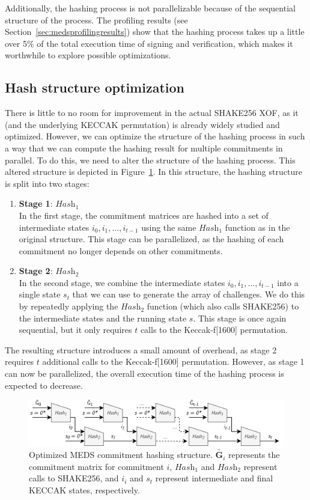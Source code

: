 \documentclass[11pt,a4paper]{report}
\theoremstyle{definition}
\begin{document}
Additionally, the hashing process is not parallelizable because of the sequential structure of the process. The profiling results (see Section~\ref{sec:medsprofilingresults}) show that the hashing process takes up a little over 5\% of the total execution time of signing and verification, which makes it worthwhile to explore possible optimizations.

\subsection{Hash structure optimization}
There is little to no room for improvement in the actual SHAKE256 XOF, as it (and the underlying KECCAK permutation) is already widely studied and optimized. However, we can optimize the structure of the hashing process in such a way that we can compute the hashing result for multiple commitments in parallel. To do this, we need to alter the structure of the hashing process. This altered structure is depicted in Figure~\ref{fig:hashstructureopt}. In this structure, the hashing structure is split into two stages:
\begin{enumerate}
  \item \textbf{Stage 1}: $\textit{Hash}_1$\\
        In the first stage, the commitment matrices are hashed into a set of intermediate states $i_0, i_1, \ldots, i_{t-1}$ using the same $\textit{Hash}_1$ function as in the original structure. This stage can be parallelized, as the hashing of each commitment no longer depends on other commitments.
  \item \textbf{Stage 2}: $\textit{Hash}_2$\\
        In the second stage, we combine the intermediate states $i_0, i_1, \ldots, i_{t-1}$ into a single state $s_t$ that we can use to generate the array of challenges. We do this by repeatedly applying the $\textit{Hash}_2$ function (which also calls SHAKE256) to the intermediate states and the running state $s$. This stage is once again sequential, but it only requires $t$ calls to the Keccak-f[1600] permutation.
\end{enumerate}
The resulting structure introduces a small amount of overhead, as stage 2 requires $t$ additional calls to the Keccak-f[1600] permutation. However, as stage 1 can now be parallelized, the overall execution time of the hashing process is expected to decrease.

\begin{figure}
  \centering
  \includegraphics[width=\textwidth]{hash/hash_struct_par.png}
  \caption{Optimized MEDS commitment hashing structure. $\tilde{\textbf{G}_i}$ represents the commitment matrix for commitment $i$, $\textit{Hash}_1$ and $\textit{Hash}_2$ represent calls to SHAKE256, and $i_i$ and $s_t$ represent intermediate and final KECCAK states, respectively.}
  \label{fig:hashstructureopt}
\end{figure}
\end{document}
